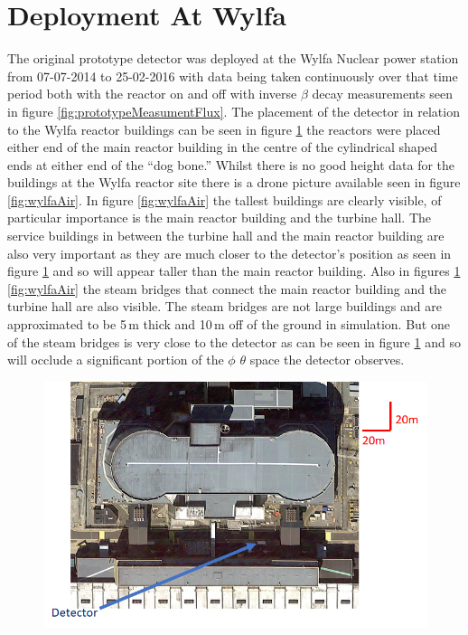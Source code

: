\section{Deployment At Wylfa}\label{sec:deploymentAtWylfa}
The original prototype detector was deployed at the Wylfa Nuclear power station from 07-07-2014 to 25-02-2016 with data being taken continuously over that time period both with the reactor on and off with inverse $\beta$ decay measurements seen in figure \ref{fig:prototypeMeasumentFlux}. The placement of the detector in relation to the Wylfa reactor buildings can be seen in figure \ref{fig:DetectorPositionTopDown} the reactors were placed either end of the main reactor building in the centre of the cylindrical shaped ends at either end of the ``dog bone.'' Whilst there is no good height data for the buildings at the Wylfa reactor site there is a drone picture available seen in figure \ref{fig:wylfaAir}. In figure \ref{fig:wylfaAir} the tallest buildings are clearly visible, of particular importance is the main reactor building and the turbine hall. The service buildings in between the turbine hall and the  main reactor building are also very important as they are much closer to the detector's position as seen in figure \ref{fig:DetectorPositionTopDown} and so will appear taller than the main reactor building. Also in figures \ref{fig:DetectorPositionTopDown} \ref{fig:wylfaAir} the steam bridges that connect the main reactor building and the turbine hall are also visible. The steam bridges are not large buildings and are approximated to be 5\,m thick and 10\,m off of the ground in simulation. But one of the steam bridges is very close to the detector as can be seen in figure \ref{fig:DetectorPositionTopDown} and so will occlude a significant portion of the $\phi$ $\theta$ space the detector observes. 

\begin{figure}[htbp]
 \centering
 \includegraphics[width=0.75\linewidth]{Chapter5/Figs/wylfaRasterNew/DetectorPositionTopDown.png}
 \label{fig:DetectorPositionTopDown}
\end{figure}

